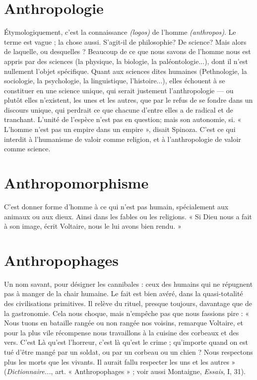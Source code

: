\section{Anthropologie}
Étymologiquement, c’est la connaissance {\it (logos)} de
l’homme {\it (anthropos)}. Le terme est vague ; la chose
aussi. S'agit-il de philosophie? De science? Mais alors de laquelle, ou
desquelles ? Beaucoup de ce que nous savons de l’homme nous est appris par
des sciences (la physique, la biologie, la paléontologie...), dont il n’est nullement
l’objet spécifique. Quant aux sciences dites humaines (Pethnologie, la
sociologie, la psychologie, la linguistique, l’histoire...), elles échouent à se constituer
en une science unique, qui serait justement l’anthropologie — ou plutôt
elles n’existent, les unes et les autres, que par le refus de se fondre dans un discours
unique, qui perdrait ce que chacune d’entre elles a de radical et de tranchant.
L'unité de l'espèce n’est pas en question; mais son autonomie, si.
« L'homme n’est pas un empire dans un empire », disait Spinoza. C’est ce qui
interdit à l’humanisme de valoir comme religion, et à l’anthropologie de valoir
comme science.

\section{Anthropomorphisme}
C’est donner forme d’homme à ce qui n’est pas
humain, spécialement aux animaux ou aux
dieux. Ainsi dans les fables ou les religions. « Si Dieu nous a fait à son image,
écrit Voltaire, nous le lui avons bien rendu. »

\section{Anthropophages}
Un nom savant, pour désigner les cannibales : ceux
des humains qui ne répugnent pas à manger de la
chair humaine. Le fait est bien avéré, dans la quasi-totalité des civilisations primitives.
Il relève du rituel, presque toujours, davantage que de la gastronomie.
Cela nous choque, mais n'empêche pas que nous fassions pire : « Nous tuons
en bataille rangée ou non rangée nos voisins, remarque Voltaire, et pour la plus
vile récompense nous travaillons à la cuisine des corbeaux et des vers. C’est Là
qu'est l’horreur, c’est là qu’est le crime ; qu'importe quand on est tué d’être
mangé par un soldat, ou par un corbeau ou un chien ? Nous respectons plus les
morts que les vivants. Il aurait fallu respecter les uns et les autres » ({\it Dictionnaire...},
art. « Anthropophages » ; voir aussi Montaigne, {\it Essais}, I, 31).

